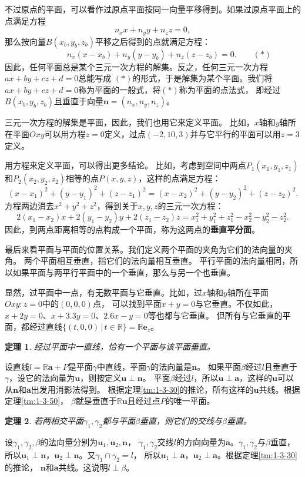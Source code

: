 \documentclass[12pt,UTF8]{ctexbook}
\newtheorem{tm}{定理}[section]
\begin{document}
不过原点的平面，可以看作过原点平面按同一向量平移得到。如果过原点平面上的点满足方程
$$ n_xx + n_yy + n_zz = 0, $$
那么按向量$B(x_b, y_b,z_b)$平移之后得到的点就满足方程：
$$ \mbox{}\qquad\qquad n_x(x - x_b) + n_y(y - y_b) + n_z(z - z_b) = 0. \quad\quad (*)$$
因此，任何平面总是某个三元一次方程的解集。反之，任何三元一次方程$ax+by+cz+d = 0$总能写成
$(*)$的形式，于是解集为某个平面。我们将$ax+by+cz+d = 0$称为平面的一般式，将$(*)$称为平面的点法式，
即经过$B(x_b, y_b,z_b)$且垂直于向量$\mathbf{n} = (n_x, n_y, n_z)$。

三元一次方程的解集是平面，因此，我们也用它来定义平面。
比如，$x$轴和$y$轴所在平面$Oxy$可以用方程$z = 0$定义，过点$(-2,10,3)$并与它平行的平面可以用$z = 3$定义。	

用方程来定义平面，可以得出更多结论。
比如，考虑到空间中两点$P_1(x_1, y_1, z_1)$和$P_2(x_2, y_2, z_2)$相等的点$P(x,y,z)$，这样的点满足方程：
$$ (x - x_1)^2 + (y - y_1)^2 + (z - z_1)^2 = (x - x_2)^2 + (y - y_2)^2 + (z - z_2)^2. $$
方程两边消去$x^2 + y^2 + z^2$，得到关于$x,y,z$的三元一次方程：
$$ 2(x_1-x_2)x + 2(y_1-y_2)y + 2(z_1-z_2)z = x_1^2+y_1^2+z_1^2 - x_2^2-y_2^2-z_2^2. $$
因此，到两点距离相等的点构成一个平面，称为这两点的\textbf{垂直平分面}。

最后来看平面与平面的位置关系。我们定义两个平面的夹角为它们的法向量的夹角。
两个平面相互垂直，指它们的法向量相互垂直。
平行平面的法向量相同，所以如果平面与两平行平面中的一个垂直，那么与另一个也垂直。

显然，过平面中一点，有无数平面与它垂直。比如，过$x$轴和$y$轴所在平面$Oxy: z = 0$中的$(0,0,0)$点，
可以找到平面$x + y = 0$与它垂直。不仅如此，$x + 2y = 0$、$x + 3.3y = 0$、$2.6x - y = 0$等也都与它垂直。
但所有与它垂直的平面，都经过直线$\{(t,0,0) \, | \, t\in \mathbb{R}\} = \mathbb{R}\mathbf{e}_z$。
\begin{tm}
    经过平面中一直线，恰有一个平面与该平面垂直。    
\end{tm}
\begin{proof2}
    设直线$l = \mathbb{R}\mathbf{a} + P$是平面$\gamma$中直线，平面$\gamma$的法向量是$\mathbf{n}$。
    如果平面$\beta$经过$l$且垂直于$\gamma$，设它的法向量为$\mathbf{u}$，则按定义$\mathbf{u}\perp\mathbf{n}$。
    平面$\beta$经过$l$，所以$\mathbf{u}\perp\mathbf{a}$，这样的$\mathbf{u}$可以从$\mathbf{n}$和$\mathbf{a}$出发用消影法得到。
    根据定理\ref{tm:1-3-30}的推论，所有这样的$\mathbf{u}$共线。根据定理\ref{tm:1-3-50}，
    $\beta$就是垂直于$\mathbb{R}\mathbf{u}$且经过点$P$的唯一平面。
\end{proof2}
\begin{tm}
    若两相交平面$\gamma_1,\gamma_2$都与平面$\beta$垂直，则它们的交线与$\beta$垂直。
\end{tm}
\begin{proof2}
    设$\gamma_1,\gamma_2,\beta$的法向量分别为$\mathbf{u}_1,\mathbf{u}_2,\mathbf{n}$，
    $\gamma_1,\gamma_2$交线$l$的方向向量为$\mathbf{a}$。$\gamma_1,\gamma_2$与$\beta$垂直，
    所以$\mathbf{u}_1\perp\mathbf{n}$，$\mathbf{u}_2\perp\mathbf{n}$。又$\gamma_1\cap\gamma_2=l$，
    所以$\mathbf{u}_1\perp\mathbf{a}$，$\mathbf{u}_2\perp\mathbf{a}$。根据定理\ref{tm:1-3-30}的推论，
    $\mathbf{n}$和$\mathbf{a}$共线。这说明$l\perp\beta$。
\end{proof2}
\end{document}
